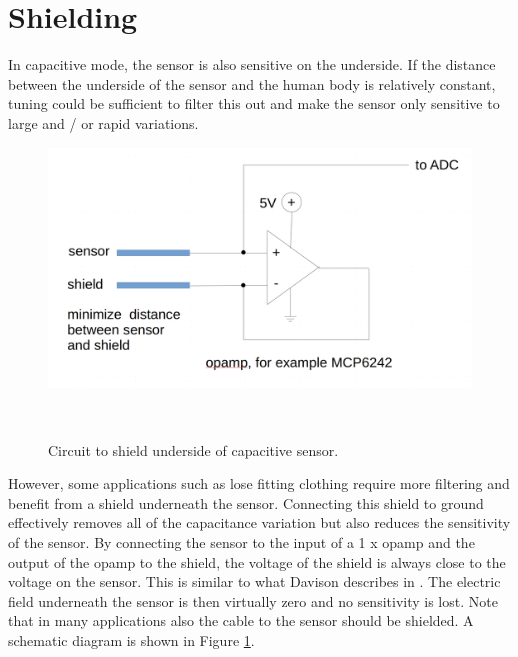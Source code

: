 \documentclass{sigchi-ext}
\begin{document}
\section{Shielding}
In capacitive mode, the sensor is also sensitive on the underside. If
the distance between the underside of the sensor and the human body is
relatively constant, tuning could be sufficient to filter
this out and make the sensor only sensitive to large and / or rapid variations.

\begin{figure}
\centering
\includegraphics[width=0.9\columnwidth]{figures/shield_circuit}
  \caption{Circuit to shield underside of capacitive
sensor.}~\label{fig:shield_circuit}
\end{figure}

However, some applications such as lose fitting clothing require more filtering
and benefit from a shield underneath the
sensor. Connecting this shield to ground effectively removes all of the
capacitance variation but also reduces the sensitivity of the sensor. By
connecting the sensor to the input of a 1 x opamp and the output of the
opamp to the shield, the voltage of the shield is always close to the
voltage on the sensor. This is similar to what Davison describes in
\cite{Davison2013a}. The electric field underneath the sensor is then
virtually zero and no sensitivity is lost. Note that in many applications also
the cable to the sensor should be shielded. A schematic diagram
is shown in Figure \ref{fig:shield_circuit}.




\end{document}
